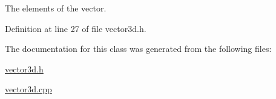 The elements of the vector. 



Definition at line 27 of file vector3d.\-h.



The documentation for this class was generated from the following files\-:\begin{DoxyCompactItemize}
\item 
\hyperlink{vector3d_8h}{vector3d.\-h}\item 
\hyperlink{vector3d_8cpp}{vector3d.\-cpp}\end{DoxyCompactItemize}
